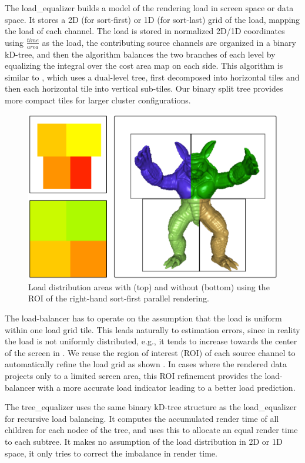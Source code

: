 The \textsf{load\_equalizer} builds a model of the rendering load in screen
space or data space. It stores a 2D (for sort-first) or 1D (for sort-last) grid
of the load, mapping the load of each channel. The load is stored in normalized
2D/1D coordinates using $\frac{time}{area}$ as the load, the contributing source
channels are organized in a binary kD-tree, and then the algorithm balances the
two branches of each level by equalizing the integral over the cost area map on
each side. This algorithm is similar to \cite{ACCC:04}, which uses a dual-level
tree, first decomposed into horizontal tiles and then each horizontal tile into
vertical sub-tiles. Our binary split tree provides more compact tiles for larger
cluster configurations.

\begin{figure}
  \includegraphics[width=.382\textwidth]{images/roi}
  \caption{Load distribution areas with (top) and without (bottom) using the ROI
    of the right-hand sort-first parallel rendering.}
  \label{fROI}
\end{figure}

The load-balancer has to operate on the assumption that the load is uniform
within one load grid tile. This leads naturally to estimation errors, since in
reality the load is not uniformly distributed, e.g., it tends to increase
towards the center of the screen in . We reuse the region of interest
(ROI) of each source channel to automatically refine the load grid as shown
. In cases where the rendered data projects only to a limited screen
area, this ROI refinement provides the load-balancer with a more accurate load
indicator leading to a better load prediction.

The \textsf{tree\_equalizer} uses the same binary kD-tree structure as the
\textsf{load\_equalizer} for recursive load balancing. It computes the
accumulated render time of all children for each nodee of the tree, and uses
this to allocate an equal render time to each subtree. It makes no assumption of
the load distribution in 2D or 1D space, it only tries to correct the imbalance
in render time.

